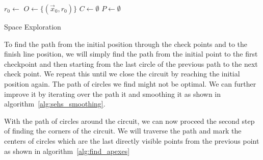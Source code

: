 \vspace{1cm}
\begin{algorithm}[H]
    \SetAlgoLined
    \DontPrintSemicolon
    

    
    $r_0\gets$ \;
    $O\gets\{(\vec{x}_0, r_0)\}$ 
    $C\gets\emptyset$ 
    $P\gets\emptyset$ 
    

    \caption{Space Exploration}
    \label{alg:space_exploration}
\end{algorithm}
\vspace{1cm}

To find the path from the initial position through the check points and to the finish line position, we will simply find the path from the initial point to the first checkpoint and then starting from the last circle of the previous path to the next check point. We repeat this until we close the circuit by reaching the initial position again. The path of circles we find might not be optimal. We can further improve it by iterating over the path it and smoothing it as shown in algorithm~\ref{alg:sehs_smoothing}.

With the path of circles around the circuit, we can now proceed the second step of finding the corners of the circuit. We will traverse the path and mark the centers of circles which are the last directly visible points from the previous point as shown in algorithm~\ref{alg:find_apexes}

